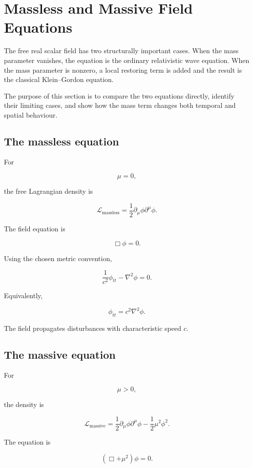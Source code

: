 \section{Massless and Massive Field Equations}
\label{sec:massless_and_massive_field_equations}

The free real scalar field has two structurally important cases. When the mass parameter vanishes, the equation is the ordinary relativistic wave equation. When the mass parameter is nonzero, a local restoring term is added and the result is the classical Klein--Gordon equation.

The purpose of this section is to compare the two equations directly, identify their limiting cases, and show how the mass term changes both temporal and spatial behaviour.

\subsection{The massless equation}

For

\[
\mu=0,
\]

the free Lagrangian density is

\[
\boxed{
\mathcal{L}_{\mathrm{massless}}
=
\frac{1}{2}
\partial_{\mu}\phi\partial^{\mu}\phi
}.
\]

The field equation is

\[
\boxed{
\Box\phi=0
}.
\]

Using the chosen metric convention,

\[
\boxed{
\frac{1}{c^{2}}\phi_{tt}
-
\nabla^{2}\phi
=0
}.
\]

Equivalently,

\[
\boxed{
\phi_{tt}
=
c^{2}\nabla^{2}\phi
}.
\]

The field propagates disturbances with characteristic speed \(c\).

\subsection{The massive equation}

For

\[
\mu>0,
\]

the density is

\[
\boxed{
\mathcal{L}_{\mathrm{massive}}
=
\frac{1}{2}
\partial_{\mu}\phi\partial^{\mu}\phi
-
\frac{1}{2}\mu^{2}\phi^{2}
}.
\]

The equation is

\[
\boxed{
(\Box+\mu^{2})\phi=0
}.
\]

